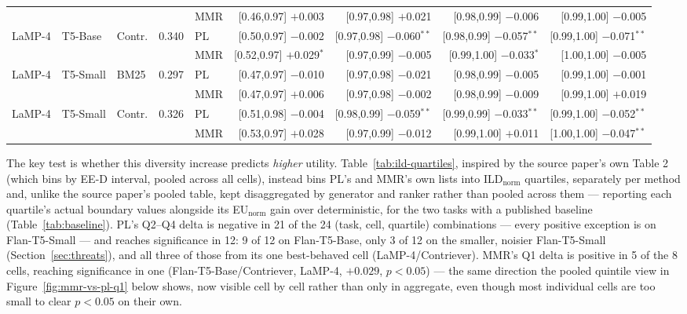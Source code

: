 \documentclass[10pt,twocolumn]{article}
\begin{document}
\begin{table}[t]
\begin{tabular}{@{}lllrlrrrr@{}}
 & & & & MMR & [0.46,0.97] $+$0.003 & [0.97,0.98] $+$0.021 & [0.98,0.99] $-$0.006 & [0.99,1.00] $-$0.005 \\
\cmidrule(lr){1-9}
\multirow{2}{*}{LaMP-4} & \multirow{2}{*}{T5-Base} & \multirow{2}{*}{Contr.} & \multirow{2}{*}{0.340} & PL & [0.50,0.97] $-$0.002 & [0.97,0.98] $-$0.060$^{**}$ & [0.98,0.99] $-$0.057$^{**}$ & [0.99,1.00] $-$0.071$^{**}$ \\
 & & & & MMR & [0.52,0.97] $+$0.029$^{*}$ & [0.97,0.99] $-$0.005 & [0.99,1.00] $-$0.033$^{*}$ & [1.00,1.00] $-$0.005 \\
\cmidrule(lr){1-9}
\multirow{2}{*}{LaMP-4} & \multirow{2}{*}{T5-Small} & \multirow{2}{*}{BM25} & \multirow{2}{*}{0.297} & PL & [0.47,0.97] $-$0.010 & [0.97,0.98] $-$0.021 & [0.98,0.99] $-$0.005 & [0.99,1.00] $-$0.001 \\
 & & & & MMR & [0.47,0.97] $+$0.006 & [0.97,0.98] $-$0.002 & [0.98,0.99] $-$0.009 & [0.99,1.00] $+$0.019 \\
\cmidrule(lr){1-9}
\multirow{2}{*}{LaMP-4} & \multirow{2}{*}{T5-Small} & \multirow{2}{*}{Contr.} & \multirow{2}{*}{0.326} & PL & [0.51,0.98] $-$0.004 & [0.98,0.99] $-$0.059$^{**}$ & [0.99,0.99] $-$0.033$^{**}$ & [0.99,1.00] $-$0.052$^{**}$ \\
 & & & & MMR & [0.53,0.97] $+$0.028 & [0.97,0.99] $-$0.012 & [0.99,1.00] $+$0.011 & [1.00,1.00] $-$0.047$^{**}$ \\
\bottomrule
\end{tabular}
\end{table}

The key test is whether this diversity increase predicts \emph{higher} utility.
Table~\ref{tab:ild-quartiles}, inspired by the source paper's own Table 2 (which bins
by EE-D interval, pooled across all cells), instead bins PL's and MMR's own lists
into ILD$_{\text{norm}}$ quartiles, separately per method and, unlike the source
paper's pooled table, kept disaggregated by generator and ranker rather than pooled
across them --- reporting each quartile's actual boundary values alongside its
EU$_{\text{norm}}$ gain over deterministic, for the two tasks with a published
baseline (Table~\ref{tab:baseline}). PL's Q2--Q4 delta is negative in 21 of the 24
(task, cell, quartile) combinations --- every positive exception is on
Flan-T5-Small --- and reaches significance in 12: 9 of 12 on Flan-T5-Base, only 3
of 12 on the smaller, noisier Flan-T5-Small (Section~\ref{sec:threats}), and all
three of those from its one best-behaved cell (LaMP-4/Contriever). MMR's Q1 delta
is positive in 5 of the 8 cells, reaching significance in one
(Flan-T5-Base/Contriever, LaMP-4, $+0.029$, $p{<}0.05$) --- the same direction the
pooled quintile view in Figure~\ref{fig:mmr-vs-pl-q1} below shows, now visible cell
by cell rather than only in aggregate, even though most individual cells are too
small to clear $p{<}0.05$ on their own.
\end{document}
